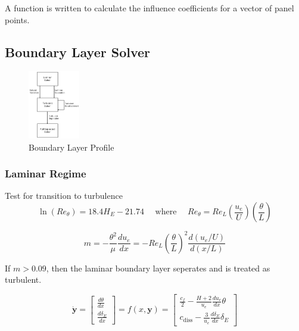 \documentclass{article}
\begin{document}
A function is written to calculate the influence coefficients for a vector of panel points.


\subsection{Boundary Layer Solver}

\begin{figure}[H]
    \centering
    \includegraphics[width=0.2\textwidth]{figures/bl_solver_flowchart.png}
    \caption{Boundary Layer Profile}
    \label{fig:BL}
\end{figure}

\subsubsection{Laminar Regime}

Test for transition to turbulence
\begin{equation}
    \ln(Re_\theta) = 18.4 H_E - 21.74 \quad \text{ where } \quad Re_\theta = Re_L\left( \frac{u_e}{U} \right) \left( \frac{\theta}{L} \right)
\end{equation}

\begin{equation}
    m = - \frac{\theta^2}{\mu}\frac{du_e}{dx} = -Re_L \left( \frac{\theta}{L} \right)^2 \frac{d(u_e / U)}{d(x/L)}
\end{equation}

If $m > 0.09$, then the laminar boundary layer seperates and is treated as turbulent.

\begin{equation}
    \dot{\mathbf{y}} = \begin{bmatrix}
        \frac{d \theta}{d x} \\[5pt]
        \frac{d \delta_E}{d x}
    \end{bmatrix} = f(x,\mathbf{y}) = \begin{bmatrix}
        \frac{c_f}{2} - \frac{H+2}{u_e}\frac{d u_e}{d x} \theta \\[5pt]
        c_\text{diss} - \frac{3}{u_e} \frac{d \delta_E}{d x} \delta_E
    \end{bmatrix}
\end{equation}
\end{document}
